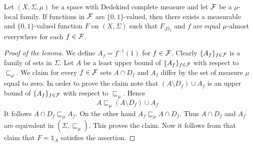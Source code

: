 \begin{lemma}\label{lemma:glueing_indicators_on_Dedekind_complete_measure}
  Let $(X,\Sigma,\mu)$ be a space with Dedekind complete measure and let ${\mathcal F}$ be a $\mu$-local family. If functions in ${\mathcal F}$ are $\{0,1\}$-valued, then there exists a measurable and $\{0,1\}$-valued function $F$ on $(X,\Sigma)$ such that $F_{\mid D_f}$ and $f$ are equal $\mu$-almost everywhere for each $f \in {\mathcal F}$.
\end{lemma}
\begin{proof}[Proof of the lemma]
  We define $A_f = f^{-1}(1)$ for $f \in {\mathcal F}$. Clearly $\{A_f\}_{f\in {\mathcal F}}$ is a family of sets in $\Sigma$. Let $A$ be a least upper bound of $\{A_{f}\}_{f\in {\mathcal F}}$ with respect to $\sqsubseteq_{\mu}$. We claim for every $f \in {\mathcal F}$ sets $A\cap D_f$ and $A_f$ differ by the set of measure $\mu$ equal to zero. In order to prove the claim note that $\left(A \setminus D_f\right) \cup A_{f}$ is an upper bound of $\{A_{f}\}_{f\in {\mathcal F}}$ with respect to $\sqsubseteq_{\mu}$. Hence
  $$A \sqsubseteq_{\mu} \left(A \setminus D_f\right) \cup A_{f}$$
  It follows $A \cap D_f \sqsubseteq_{\mu} A_{f}$. On the other hand $A_f \sqsubseteq_{\mu} A\cap D_f$. Thus $A \cap D_f$ and $A_{f}$ are equivalent in $\left(\Sigma, \sqsubseteq_{\mu}\right)$. This proves the claim. Now it follows from that claim that $F = \mathbb{1}_{A}$ satisfies the assertion.
\end{proof}

